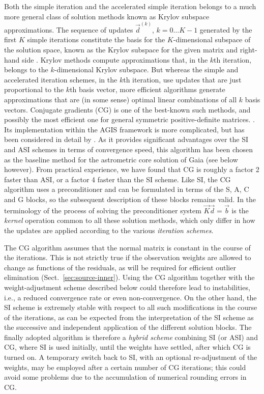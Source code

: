 \documentclass[structabstract]{aa}
\begin{document}
Both the simple iteration and the accelerated simple iteration belongs to a much
more general class of solution methods known as Krylov subspace approximations.
The sequence of updates $\vec{d}^{(k)}$, $k=0\dots K-1$ generated by the first
$K$ simple iterations constitute the basis for the $K$-dimensional subspace of the
solution space, known as the Krylov subspace for the given matrix and
right-hand side \citep[e.g.,][]{book:greenbaum-1997,vanVorst:03}. Krylov methods
compute approximations that, in the $k$th iteration, belongs to the $k$-dimensional
Krylov subspace. But whereas the simple and accelerated iteration schemes, in the
$k$th iteration, use updates that are just proportional to the $k$th basis vector, 
more efficient algorithms generate approximations that are (in some sense) optimal
linear combinations of all $k$ basis vectors. Conjugate gradients (CG) is one of the 
best-known such methods, and possibly the most efficient one for general
symmetric positive-definite matrices.
\citep[e.g.,][]{axelsson96,book:bjork-1996,vanVorst:03}. Its
implementation within the AGIS framework is more complicated, but 
has been considered in detail by \citet{bombrun+10}. As it 
provides significant advantages over the SI and ASI schemes in terms of 
convergence speed, this algorithm has been 
chosen as the baseline method for the astrometric core solution of Gaia
(see below however). From practical experience, we have found that CG
is roughly a factor 2 faster than ASI, or a factor
4 faster than the SI scheme. Like SI, the CG algorithm uses a preconditioner 
and can be formulated in terms of the S, A, C and G blocks, so the subsequent 
description of these blocks remains valid. In the terminology of \citet{bombrun+10}
the process of solving the preconditioner system $\vec{K}\vec{d}=\vec{b}$
is the \emph{kernel} operation common to all these solution methods, which 
only differ in how the updates are applied according to the various 
\emph{iteration schemes}. 

The CG algorithm assumes that the normal matrix
is constant in the course of the iterations. This is not strictly true if
the observation weights are allowed to change as functions of the
residuals, as will be required for efficient outlier elimination 
(Sect.~\ref{sec:source-inner}). Using the CG algorithm together with
the weight-adjustment scheme described below could therefore lead
to instabilities, i.e., a reduced convergence rate or even non-convergence.
On the other hand, the SI scheme is extremely stable with respect to
all such modifications in the course of the iterations, as can be expected 
from the interpretation of the SI scheme as the successive and independent
application of the different solution blocks. The finally adopted algorithm
is therefore a \emph{hybrid scheme} combining SI (or ASI) and CG, where 
SI is used initially, until the weights have settled, after which CG is turned on. 
A temporary switch back to SI, with an optional re-adjustment of the 
weights, may be employed after a certain number of CG iterations; this
could avoid some problems due to the accumulation of numerical rounding 
errors in CG.
\end{document}
